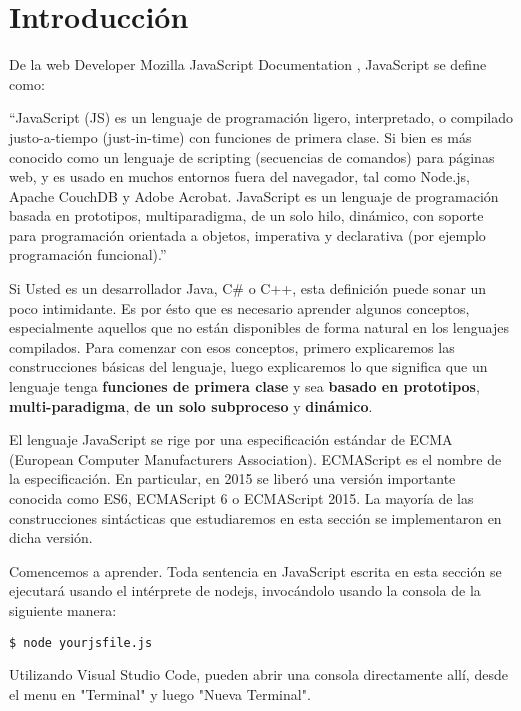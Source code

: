 \documentclass[a4paper, oneside, titlepage, 12pt]{book}
\begin{document}
\section{Introducción}

De la web Developer Mozilla JavaScript Documentation \cite{mozilla}, JavaScript se define como:

``JavaScript (JS) es un lenguaje de programación ligero, interpretado, o compilado justo-a-tiempo (just-in-time) con funciones de primera clase. Si bien es más conocido como un lenguaje de scripting (secuencias de comandos) para páginas web, y es usado en muchos entornos fuera del navegador, tal como Node.js, Apache CouchDB y Adobe Acrobat. JavaScript es un lenguaje de programación basada en prototipos, multiparadigma, de un solo hilo, dinámico, con soporte para programación orientada a objetos, imperativa y declarativa (por ejemplo programación funcional).''
\newline

Si Usted es un desarrollador Java, C\# o C++, esta definición puede sonar un poco intimidante. Es por ésto que es necesario aprender algunos conceptos, especialmente aquellos que no están disponibles de forma natural en los lenguajes compilados. Para comenzar con esos conceptos, primero explicaremos las construcciones básicas del lenguaje, luego explicaremos lo que significa que un lenguaje tenga \textbf{funciones de primera clase} y sea \textbf {basado en prototipos}, \textbf{multi-paradigma}, \textbf{de un solo subproceso} y \textbf{dinámico}.
\newline

El lenguaje JavaScript se rige por una especificación estándar de ECMA\cite{ecma} (European Computer Manufacturers Association). ECMAScript es el nombre de la especificación. En particular, en 2015 se liberó una versión importante conocida como ES6, ECMAScript 6 o ECMAScript 2015. La mayoría de las construcciones sintácticas que estudiaremos en esta sección se implementaron en dicha versión.
\newline

Comencemos a aprender. Toda sentencia en JavaScript escrita en esta sección se ejecutará usando el intérprete de nodejs, invocándolo usando la consola de la siguiente manera:
\begin{verbatim}
$ node yourjsfile.js
\end{verbatim}

Utilizando Visual Studio Code, pueden abrir una consola directamente allí, desde el menu en "Terminal" y luego "Nueva Terminal". 
\newline
\end{document}
